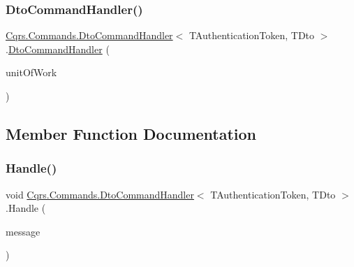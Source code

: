\subsubsection{\texorpdfstring{Dto\+Command\+Handler()}{DtoCommandHandler()}}
{\footnotesize\ttfamily \hyperlink{classCqrs_1_1Commands_1_1DtoCommandHandler}{Cqrs.\+Commands.\+Dto\+Command\+Handler}$<$ T\+Authentication\+Token, T\+Dto $>$.\hyperlink{classCqrs_1_1Commands_1_1DtoCommandHandler}{Dto\+Command\+Handler} (\begin{DoxyParamCaption}\item[{\hyperlink{interfaceCqrs_1_1Domain_1_1IUnitOfWork}{I\+Unit\+Of\+Work}$<$ T\+Authentication\+Token $>$}]{unit\+Of\+Work }\end{DoxyParamCaption})}



\subsection{Member Function Documentation}
\mbox{\label{classCqrs_1_1Commands_1_1DtoCommandHandler_a344c5d909b31fe7ad6b81c69ab569fc8_a344c5d909b31fe7ad6b81c69ab569fc8}} 
\subsubsection{\texorpdfstring{Handle()}{Handle()}}
{\footnotesize\ttfamily void \hyperlink{classCqrs_1_1Commands_1_1DtoCommandHandler}{Cqrs.\+Commands.\+Dto\+Command\+Handler}$<$ T\+Authentication\+Token, T\+Dto $>$.Handle (\begin{DoxyParamCaption}\item[{\hyperlink{classCqrs_1_1Commands_1_1DtoCommand}{Dto\+Command}$<$ T\+Authentication\+Token, T\+Dto $>$}]{message }\end{DoxyParamCaption})}

